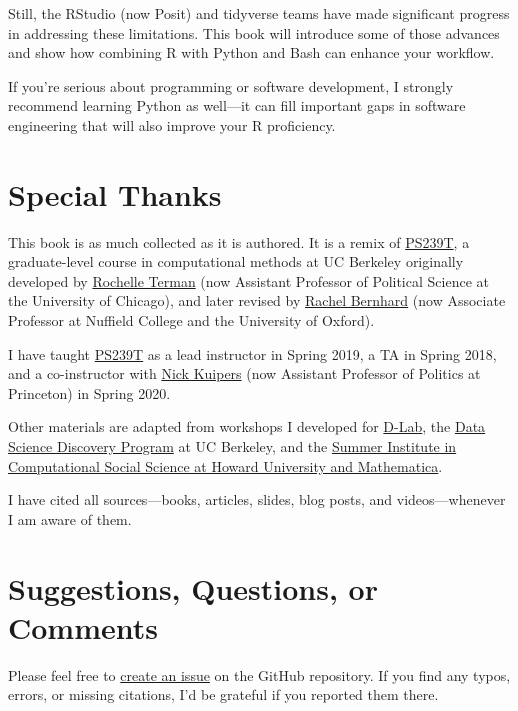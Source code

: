 \documentclass[
]{book}
\begin{document}
Still, the RStudio (now Posit) and tidyverse teams have made significant progress in addressing these limitations. This book will introduce some of those advances and show how combining R with Python and Bash can enhance your workflow.

If you're serious about programming or software development, I strongly recommend learning Python as well---it can fill important gaps in software engineering that will also improve your R proficiency.

\section{Special Thanks}\label{special-thanks}

This book is as much collected as it is authored. It is a remix of \href{https://github.com/rochelleterman/PS239T}{PS239T}, a graduate-level course in computational methods at UC Berkeley originally developed by \href{http://rochelleterman.com/}{Rochelle Terman} (now Assistant Professor of Political Science at the University of Chicago), and later revised by \href{http://rachelbernhard.com/}{Rachel Bernhard} (now Associate Professor at Nuffield College and the University of Oxford).

I have taught \href{https://github.com/PS239T/spring_2021}{PS239T} as a lead instructor in Spring 2019, a TA in Spring 2018, and a co-instructor with \href{https://nicholaskuipers.com/}{Nick Kuipers} (now Assistant Professor of Politics at Princeton) in Spring 2020.

Other materials are adapted from workshops I developed for \href{https://dlab.berkeley.edu/}{D-Lab}, the \href{https://data.berkeley.edu/research/discovery-program-home}{Data Science Discovery Program} at UC Berkeley, and the \href{https://sicss.io/2021/howard-mathematica/}{Summer Institute in Computational Social Science at Howard University and Mathematica}.

I have cited all sources---books, articles, slides, blog posts, and videos---whenever I am aware of them.

\section{Suggestions, Questions, or Comments}\label{suggestions-questions-or-comments}

Please feel free to \href{https://github.com/jaeyk/PS239T/issues}{create an issue} on the GitHub repository. If you find any typos, errors, or missing citations, I'd be grateful if you reported them there.
\end{document}
